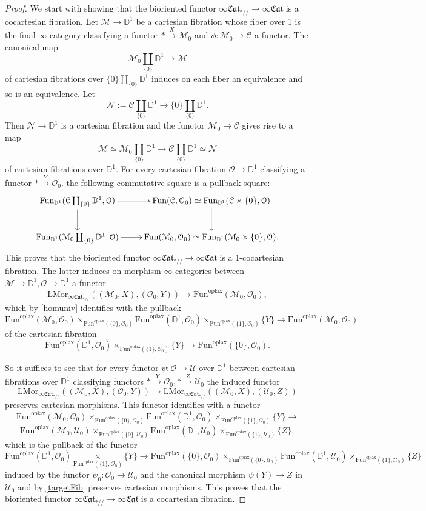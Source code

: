 \documentclass[10pt,oneside]{article}
\numberwithin{equation}{section} %
\numberwithin{figure}{section} %
\theoremstyle{plain}
\theoremstyle{definition}
\newcommand{\bD}{{\mathbb D}}
\newcommand{\mC}{{\mathcal C}}
\newcommand{\mM}{{\mathcal M}}
\newcommand{\mN}{{\mathcal N}}
\newcommand{\mO}{{\mathcal O}}
\newcommand{\mU}{{\mathcal U}}
\renewcommand{\L}{{\mathrm L}}
\newcommand{\Fun}{\mathrm{Fun}}
\newcommand{\oplax}{{\mathrm{oplax}}}
\newcommand{\Mor}{{\mathrm{Mor}}}
\newcommand{\fcat}{\mathfrak{Cat}}
\begin{document}
\begin{proof}
We start with showing that the bioriented functor $\infty\fcat_{*//} \to \infty\fcat$ is a cocartesian fibration.
Let $\mM \to \bD^1$ be a cartesian fibration whose fiber over 1 is the final $\infty$-category classifying a functor $* \xrightarrow{X} \mM_0$
and $\phi: \mM_0 \to \mC$ a functor.
The canonical map
$$ \mM_0 \coprod_{\{0\}} \bD^1 \to \mM$$ of cartesian fibrations over $\{0\} \coprod_{\{0\}} \bD^1$ induces on each fiber an equivalence and so is an equivalence.
Let $$ \mN := \mC \coprod_{\{0\}} \bD^1 \to \{0\} \coprod_{\{0\}} \bD^1.$$
Then $\mN \to \bD^1$ is a cartesian fibration and the functor $\mM_0 \to \mC$ gives rise to a map
$$\mM \simeq \mM_0 \coprod_{\{0\}} \bD^1 \to \mC \coprod_{\{0\}} \bD^1 \simeq \mN$$ of cartesian fibrations over $\bD^1.$
For every cartesian fibration $\mO \to \bD^1$
classifying a functor $ * \xrightarrow{Y} \mO_0. $
the following commutative square is a pullback square:
$$
\begin{xy}
\xymatrix{
\Fun_{\bD^1}(\mC \coprod_{\{0\}} \bD^1,\mO) \ar[d] \ar[r]
& \Fun(\mC,\mO_0) \simeq  \Fun_{\bD^1}(\mC \times\{0\},\mO)\ar[d]
\\ 
\Fun_{\bD^1}(\mM_0 \coprod_{\{0\}} \bD^1,\mO)  \ar[r] & \Fun(\mM_0,\mO_0) \simeq  \Fun_{\bD^1}(\mM_0 \times\{0\},\mO).
}
\end{xy}$$
This proves that the bioriented functor $\infty\fcat_{*//} \to \infty\fcat$ is a 1-cocartesian fibration.
The latter induces on morphism $\infty$-categories between $\mM \to \bD^1, \mO\to \bD^1$ a functor
$$ \L\Mor_{\infty\fcat_{*//}}((\mM_0,X),(\mO_0,Y)) \to \Fun^\oplax(\mM_0,\mO_0) ,$$ which by \cref{homuniv} identifies with the pullback $$\Fun^\oplax(\mM_0,\mO_0) \times_{\Fun^\oplax(\{0\},\mO_0)} \Fun^\oplax(\bD^1,\mO_0) \times_{\Fun^\oplax(\{1\},\mO_0)} \{Y\} \to \Fun^\oplax(\mM_0,\mO_0)$$
of the cartesian fibration
$$  \Fun^\oplax(\bD^1,\mO_0) \times_{\Fun^\oplax(\{1\},\mO_0)} \{Y\} \to \Fun^\oplax(\{0\},\mO_0). $$

So it suffices to see that for every functor $\psi: \mO \to \mU $ over $\bD^1$
between cartesian fibrations over $\bD^1$ classifying functors $* \xrightarrow{Y} \mO_0, * \xrightarrow{Z} \mU_0 $ the induced functor
$$\L\Mor_{\infty\fcat_{*//}}((\mM_0,X),(\mO_0,Y)) \to \L\Mor_{\infty\fcat_{*//}}((\mM_0,X),(\mU_0,Z))
$$ preserves cartesian morphisms. 
This functor identifies with a functor
$$\Fun^\oplax(\mM_0,\mO_0) \times_{\Fun^\oplax(\{0\},\mO_0)} \Fun^\oplax(\bD^1,\mO_0) \times_{\Fun^\oplax(\{1\},\mO_0)} \{Y\} \to $$$$ \Fun^\oplax(\mM_0,\mU_0) \times_{\Fun^\oplax(\{0\},\mU_0)} \Fun^\oplax(\bD^1,\mU_0) \times_{\Fun^\oplax(\{1\},\mU_0)} \{Z\}, $$
which is the pullback of the functor
$$ \Fun^\oplax(\bD^1,\mO_0) \underset{\Fun^\oplax(\{1\},\mO_0)}{\times} \{Y\} \to \Fun^\oplax(\{0\},\mO_0) \times_{\Fun^\oplax(\{0\},\mU_0)} \Fun^\oplax(\bD^1,\mU_0) \times_{\Fun^\oplax(\{1\},\mU_0)} \{Z\} $$
induced by the functor $\psi_0: \mO_0 \to \mU_0 $ and the canonical morphism $ \psi(Y) \to Z$ in 
$\mU_0$ and by \cref{targetFib} preserves cartesian morphisms. 
This proves that the bioriented functor $\infty\fcat_{*//} \to \infty\fcat$ is a cocartesian fibration.


\end{proof}
\end{document}
